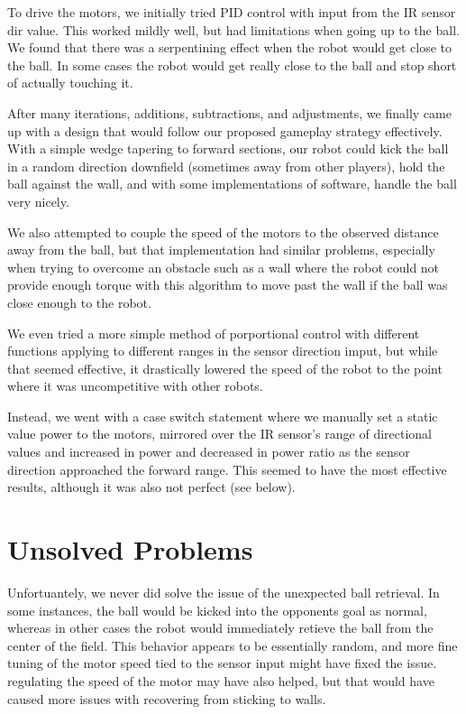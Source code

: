 \documentclass[journal]{../IEEEtran}
\begin{document}
To drive the motors, we initially tried PID control with input from the IR sensor dir value. This worked mildly well, but had limitations when going up to the ball. We found that there was a serpentining effect when the robot would get close to the ball. In some cases the robot would get really close to the ball and stop short of actually touching it. 

After many iterations, additions, subtractions, and adjustments, we finally came up with a design that would follow our proposed gameplay strategy effectively. With a simple wedge tapering to forward sections, our robot could kick the ball in a random direction downfield (sometimes away from other players), hold the ball against the wall, and with some implementations of software, handle the ball very nicely.

We also attempted to couple the speed of the motors to the observed distance away from the ball, but that implementation had similar problems, especially when trying to overcome an obstacle such as a wall where the robot could not provide enough torque with this algorithm to move past the wall if the ball was close enough to the robot.

We even tried a more simple method of porportional control with different functions applying to different ranges in the sensor direction imput, but while that seemed effective, it drastically lowered the speed of the robot to the point where it was uncompetitive with other robots.

Instead, we went with a case switch statement where we manually set a static value power to the motors, mirrored over the IR sensor's range of directional values and increased in power and decreased in power ratio as the sensor direction approached the forward range. This seemed to have the most effective results, although it was also not perfect (see below).

\section{Unsolved Problems}\label{S.unsolved}

Unfortuantely, we never did solve the issue of the unexpected ball retrieval. In some instances, the ball would be kicked into the opponents goal as normal, whereas in other cases the robot would immediately retieve the ball from the center of the field. This behavior appears to be essentially random, and more fine tuning of the motor speed tied to the sensor input might have fixed the issue. regulating the speed of the motor may have also helped, but that would have caused more issues with recovering from sticking to walls.
\end{document}
